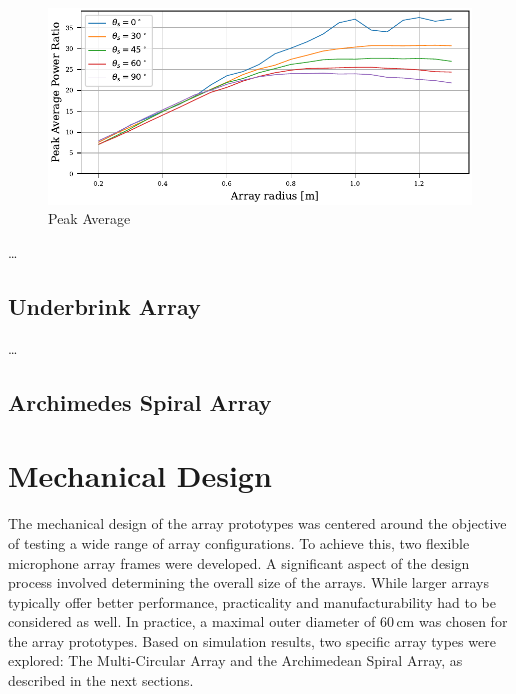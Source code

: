 \begin{figure}
	\centering
	\includegraphics[]{images/5_array_evaluation/PAP_circ.pdf}
	\caption{Peak Average }
	\label{aev:fig:papCirc}
\end{figure}
\dots
\subsection{Underbrink Array}
\dots
\subsection{Archimedes Spiral Array}

\newpage
\section{Mechanical Design}
The mechanical design of the array prototypes was centered around the objective of testing a wide range of array configurations.
To achieve this, two flexible microphone array frames were developed.
A significant aspect of the design process involved determining the overall size of the arrays.
While larger arrays typically offer better performance, practicality and manufacturability had to be considered as well.
In practice, a maximal outer diameter of 60\,cm was chosen for the array prototypes.
Based on simulation results, two specific array types were explored: The Multi-Circular Array and the Archimedean Spiral Array, as described in the next sections.

